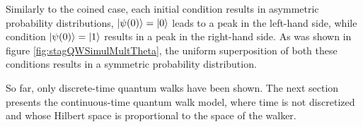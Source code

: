 \documentclass[../../dissertation.tex]{subfiles}
\begin{document}
Similarly to the coined case, each initial condition results in asymmetric
probability distributions, $\ket{\psi(0)}=\ket{0}$ leads to a peak  in the
left-hand side, while condition $\ket{\psi(0)}=\ket{1}$ results in a peak in the
right-hand side. As was shown in figure \ref{fig:stagQWSimulMultTheta}, the
uniform superposition of both these conditions results in a symmetric
probability distribution.\par So far, only discrete-time quantum walks have
been shown. The next section presents the continuous-time quantum walk model,
where time is not discretized and whose Hilbert space is proportional to the
space of the walker.

\end{document}
